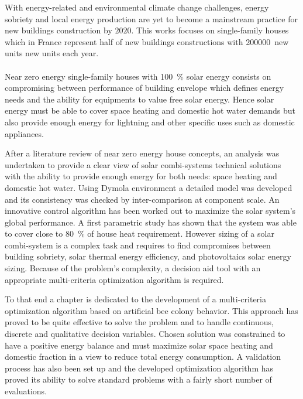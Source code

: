 


With energy-related and environmental climate change challenges, energy sobriety and local
energy production are yet to become a mainstream practice for new buildings construction by
$2020$. This works focuses on single-family houses which in France represent half of new
buildings constructions with \si{200000}~new units new units each year.

\paragraph{} %
Near zero energy single-family houses with \SI{100}{\percent} solar energy consists on compromising
between performance of building envelope which defines energy needs and the ability
for equipments to value free solar energy. Hence solar energy must be able to cover
space heating and domestic hot water demands but also provide enough energy for
lightning and other specific uses such as domestic appliances.

After a literature review of near zero energy house concepts, an analysis was undertaken
to provide a clear view of solar combi-systems technical solutions with the ability to
provide enough energy for both needs: space heating and domestic hot water. Using Dymola
environment a detailed model was developed and its consistency was checked by
inter-comparison at component scale. An innovative control algorithm has been worked out to
maximize the solar system’s global performance. A first parametric study has shown that the system
was able to cover close to \SI{80}{\percent} of house heat requirement. However sizing of a solar
combi-system is a complex task and requires to find compromises between building sobriety, solar
thermal energy efficiency, and photovoltaics solar energy sizing. Because of the problem’s
complexity, a decision aid tool with an appropriate multi-criteria optimization algorithm
is required.

To that end a chapter is dedicated to the development of a multi-criteria optimization
algorithm based on artificial bee colony behavior. This approach has proved to be quite effective
to solve the problem and to handle continuous, discrete and qualitative decision variables.
Chosen solution was constrained to have a positive energy balance and must maximize solar
space heating and domestic fraction in a view to reduce total energy consumption.
A validation process has also been set up and the developed optimization algorithm
has proved its ability to solve standard problems with a fairly short number of evaluations.

